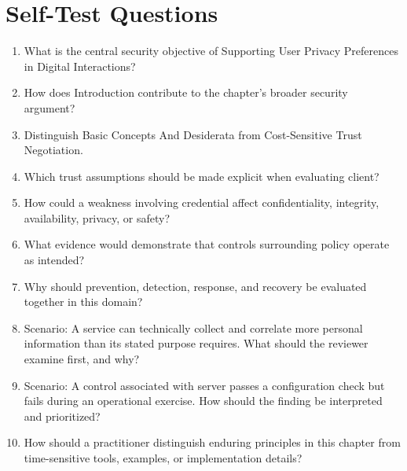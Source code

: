 \documentclass[11pt]{article}
\begin{document}
\section*{Self-Test Questions}
\begin{enumerate}
\item What is the central security objective of Supporting User Privacy Preferences in Digital Interactions?
\item How does Introduction contribute to the chapter's broader security argument?
\item Distinguish Basic Concepts And Desiderata from Cost-Sensitive Trust Negotiation.
\item Which trust assumptions should be made explicit when evaluating client?
\item How could a weakness involving credential affect confidentiality, integrity, availability, privacy, or safety?
\item What evidence would demonstrate that controls surrounding policy operate as intended?
\item Why should prevention, detection, response, and recovery be evaluated together in this domain?
\item Scenario: A service can technically collect and correlate more personal information than its stated purpose requires. What should the reviewer examine first, and why?
\item Scenario: A control associated with server passes a configuration check but fails during an operational exercise. How should the finding be interpreted and prioritized?
\item How should a practitioner distinguish enduring principles in this chapter from time-sensitive tools, examples, or implementation details?
\end{enumerate}
\end{document}
